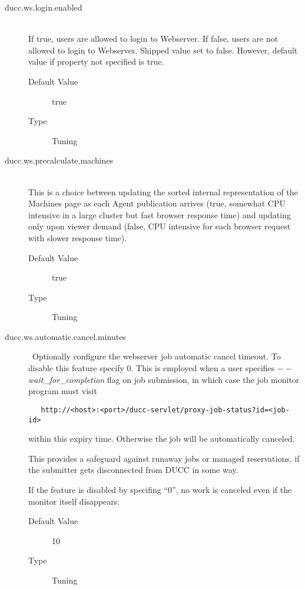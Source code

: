 \begin{description}
        \item[ducc.ws.login.enabled] \hfill \\
          If true, users are allowed to login to Webserver.  If false, users are
          not allowed to login to Webserver.  Shipped value set to false. 
          However, default value if property not specified is true.
          \begin{description}
            \item[Default Value] true
            \item[Type] Tuning
          \end{description}
        
        \item[ducc.ws.precalculate.machines] \hfill \\
          This is a choice between updating the sorted internal representation of the 
          Machines page as each Agent publication arrives (true, somewhat CPU intensive
          in a large cluster but fast browser response time) and updating only upon viewer 
          demand (false, CPU intensive for each browser request with slower response time).
          \begin{description}
            \item[Default Value] true
            \item[Type] Tuning
          \end{description}
            
        \item[ducc.ws.automatic.cancel.minutes] \hfill \ Optionally configure the webserver job
          automatic cancel timeout. To disable this feature specify 0.  This is employed when a user
          specifies {\em$--$wait\_for\_completion} flag on job submission, in which case the job
          monitor program must visit 
\begin{verbatim}
   http://<host>:<port>/ducc-servlet/proxy-job-status?id=<job-id>
\end{verbatim}
          within this expiry time.  Otherwise the job will be automatically canceled.

          This provides a safeguard against runaway jobs or managed reservations, if the
          submitter gets disconnected from DUCC in some way.

          If the feature is disabled by specifing ``0'', no work is canceled even if the
          monitor itself disappears.

          \begin{description}
            \item[Default Value] 10
            \item[Type] Tuning
          \end{description}


\end{description}
